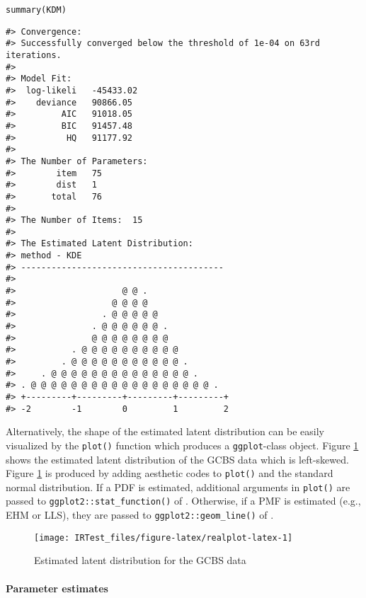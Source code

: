 \begin{verbatim}
summary(KDM)
\end{verbatim}

\begin{verbatim}
#> Convergence:  
#> Successfully converged below the threshold of 1e-04 on 63rd iterations. 
#> 
#> Model Fit:  
#>  log-likeli   -45433.02 
#>    deviance   90866.05 
#>         AIC   91018.05 
#>         BIC   91457.48 
#>          HQ   91177.92 
#> 
#> The Number of Parameters:  
#>        item   75 
#>        dist   1 
#>       total   76 
#> 
#> The Number of Items:  15 
#> 
#> The Estimated Latent Distribution:  
#> method - KDE 
#> ----------------------------------------
#>                                           
#>                     @ @ .                 
#>                   @ @ @ @                 
#>                 . @ @ @ @ @               
#>               . @ @ @ @ @ @ .             
#>               @ @ @ @ @ @ @ @             
#>           . @ @ @ @ @ @ @ @ @ @           
#>         . @ @ @ @ @ @ @ @ @ @ @ .         
#>     . @ @ @ @ @ @ @ @ @ @ @ @ @ @ .       
#> . @ @ @ @ @ @ @ @ @ @ @ @ @ @ @ @ @ @ .   
#> +---------+---------+---------+---------+
#> -2        -1        0         1         2
\end{verbatim}

Alternatively, the shape of the estimated latent distribution can be
easily visualized by the \texttt{plot()} function which produces a \texttt{ggplot}-class object.
Figure
\ref{fig:realplot-latex}
shows the estimated latent distribution of the GCBS data which is
left-skewed. Figure
\ref{fig:realplot-latex}
is produced by adding aesthetic codes to \texttt{plot()} and the standard normal distribution.
If a PDF is estimated,
additional arguments in \texttt{plot()} are passed to \texttt{ggplot2::stat\_function()} of
 \citep{ggplot2}. Otherwise, if a PMF is estimated (e.g.,
EHM or LLS), they are passed to \texttt{ggplot2::geom\_line()} of .

\begin{figure}[H]

{\centering \texttt{[image: IRTest\_files/figure-latex/realplot-latex-1]} 

}

\caption{Estimated latent distribution for the GCBS data}\label{fig:realplot-latex}
\end{figure}

\hypertarget{parameter-estimates-1}{%
\paragraph{Parameter estimates}\label{parameter-estimates-1}}

